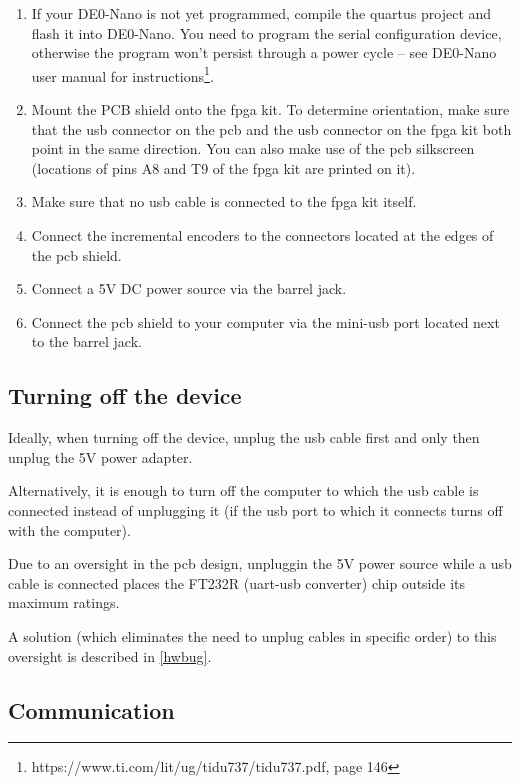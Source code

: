 \documentclass[twoside]{article}
\begin{document}
\begin{enumerate}
\item If your DE0-Nano is not yet programmed, compile the quartus project and flash it into DE0-Nano. You need to program the serial configuration device, otherwise the program won't persist through a power cycle -- see DE0-Nano user manual for instructions\footnote{https://www.ti.com/lit/ug/tidu737/tidu737.pdf, page 146}.
\item Mount the PCB shield onto the fpga kit. To determine orientation, make sure that the usb connector on the pcb and the usb connector on the fpga kit both point in the same direction. You can also make use of the pcb silkscreen (locations of pins A8 and T9 of the fpga kit are printed on it).
\item Make sure that no usb cable is connected to the fpga kit itself.
\item Connect the incremental encoders to the connectors located at the edges of the pcb shield.
\item Connect a 5V DC power source via the barrel jack.
\item Connect the pcb shield to your computer via the mini-usb port located next to the barrel jack.
\end{enumerate}

\subsection{Turning off the device}
\label{turnoff}

Ideally, when turning off the device, unplug the usb cable first and only then unplug the 5V power adapter.

Alternatively, it is enough to turn off the computer to which the usb cable is connected instead of unplugging it (if the usb port to which it connects turns off with the computer).

Due to an oversight in the pcb design, unpluggin the 5V power source while a usb cable is connected places the FT232R (uart-usb converter) chip outside its maximum ratings. 

A solution (which eliminates the need to unplug cables in specific order) to this oversight is described in \ref{hwbug}.

\newpage{}

\subsection{Communication}
\end{document}
